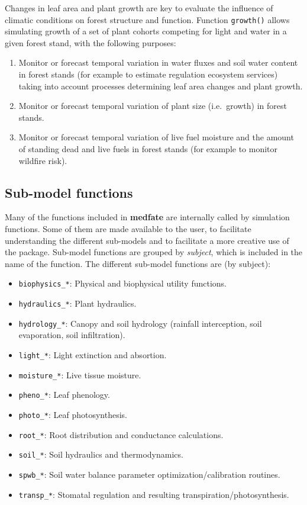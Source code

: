 \documentclass[]{book}
\providecommand{\tightlist}{%
  \setlength{\itemsep}{0pt}\setlength{\parskip}{0pt}}
\begin{document}
Changes in leaf area and plant growth are key to evaluate the influence
of climatic conditions on forest structure and function. Function
\texttt{growth()} allows simulating growth of a set of plant cohorts
competing for light and water in a given forest stand, with the
following purposes:

\begin{enumerate}
\def\labelenumi{\arabic{enumi}.}
\tightlist
\item
  Monitor or forecast temporal variation in water fluxes and soil water
  content in forest stands (for example to estimate regulation ecosystem
  services) taking into account processes determining leaf area changes
  and plant growth.
\item
  Monitor or forecast temporal variation of plant size (i.e.~growth) in
  forest stands.
\item
  Monitor or forecast temporal variation of live fuel moisture and the
  amount of standing dead and live fuels in forest stands (for example
  to monitor wildfire risk).
\end{enumerate}

\subsection{Sub-model functions}\label{sub-model-functions}

Many of the functions included in \textbf{medfate} are internally called
by simulation functions. Some of them are made available to the user, to
facilitate understanding the different sub-models and to facilitate a
more creative use of the package. Sub-model functions are grouped by
\emph{subject}, which is included in the name of the function. The
different sub-model functions are (by subject):

\begin{itemize}
\tightlist
\item
  \texttt{biophysics\_*}: Physical and biophysical utility functions.
\item
  \texttt{hydraulics\_*}: Plant hydraulics.
\item
  \texttt{hydrology\_*}: Canopy and soil hydrology (rainfall
  interception, soil evaporation, soil infiltration).
\item
  \texttt{light\_*}: Light extinction and absortion.
\item
  \texttt{moisture\_*}: Live tissue moisture.
\item
  \texttt{pheno\_*}: Leaf phenology.
\item
  \texttt{photo\_*}: Leaf photosynthesis.
\item
  \texttt{root\_*}: Root distribution and conductance calculations.
\item
  \texttt{soil\_*}: Soil hydraulics and thermodynamics.
\item
  \texttt{spwb\_*}: Soil water balance parameter
  optimization/calibration routines.
\item
  \texttt{transp\_*}: Stomatal regulation and resulting
  transpiration/photosynthesis.
\end{itemize}
\end{document}
